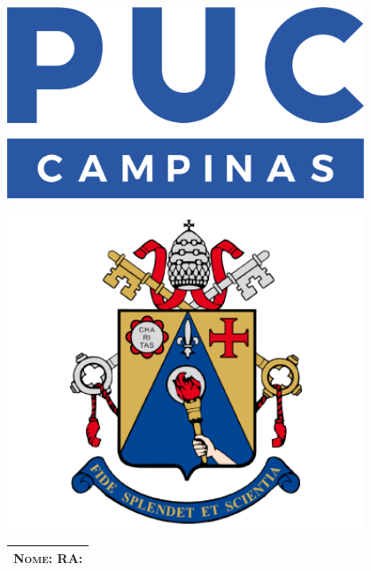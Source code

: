 \pagestyle{fancy}

\begin{center}
	\begin{minipage}[C]{0.15\textwidth}
		\begin{center}
			\includegraphics[width=0.8\textwidth]{imgs/logo-college.png}
		\end{center}
	\end{minipage}
	\begin{minipage}[C]{0.6\textwidth}
		\begin{center}
			\textsc{\collegename}
			
			\textsc{\schoolname}
			
			\textsc{\facultyname}
		\end{center}
	\end{minipage}
	\begin{minipage}[C]{0.15\textwidth}
		\begin{center}
			\includegraphics[width=0.8\textwidth]{imgs/badge-college.png}
		\end{center}
	\end{minipage}
\end{center}

\begin{center}
	\begin{tabular}{c}
		\noindent\textsc{Nome:} \hspace{10cm} \textsc{RA:} \hspace{4cm} \\ \hline 
	\end{tabular}
\end{center}

\begin{center}
	{\huge \textbf{\doctitle}}
	
	\vspace{2mm}
	
	\fdocsubtitle
	
	\vspace{1mm}
	
	\fdocduedate
\end{center}
